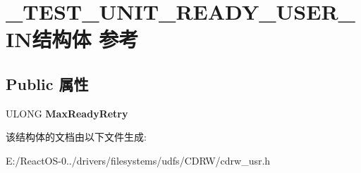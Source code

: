 \hypertarget{struct___t_e_s_t___u_n_i_t___r_e_a_d_y___u_s_e_r___i_n}{}\section{\+\_\+\+T\+E\+S\+T\+\_\+\+U\+N\+I\+T\+\_\+\+R\+E\+A\+D\+Y\+\_\+\+U\+S\+E\+R\+\_\+\+I\+N结构体 参考}
\label{struct___t_e_s_t___u_n_i_t___r_e_a_d_y___u_s_e_r___i_n}
\subsection*{Public 属性}
\begin{DoxyCompactItemize}
\item 
\mbox{\label{struct___t_e_s_t___u_n_i_t___r_e_a_d_y___u_s_e_r___i_n_a03b77b09a89526dbd68a4621e03baa77}} 
U\+L\+O\+NG {\bfseries Max\+Ready\+Retry}
\end{DoxyCompactItemize}


该结构体的文档由以下文件生成\+:\begin{DoxyCompactItemize}
\item 
E\+:/\+React\+O\+S-\/0../drivers/filesystems/udfs/\+C\+D\+R\+W/cdrw\+\_\+usr.\+h\end{DoxyCompactItemize}
